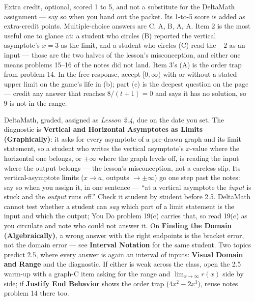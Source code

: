 \documentclass[10pt]{article}
\begin{document}
\begin{teachernote}[AP Practice]
Extra credit, optional, scored 1 to 5, and not a substitute for the DeltaMath assignment --- say so when you
hand out the packet. Its 1-to-5 score is added as extra-credit points. Multiple-choice answers are C, A, B, A, A. Item 2 is the most useful one to
glance at: a student who circles (B) reported the vertical asymptote's $x = 3$ as the limit,
and a student who circles (C) read the $-2$ as an input --- those are the two halves of the
lesson's misconception, and either one means problems 15--16 of the notes did not land. Item 3's
(A) is the order trap from problem 14. In the free response, accept $[0, \infty)$ with or without
a stated upper limit on the game's life in (b); part (e) is the deepest question on the page ---
credit any answer that reaches $8/(t + 1) = 0$ and says it has no solution, so 9 is not in the
range.
\end{teachernote}

\begin{teachernote}[Homework]
DeltaMath, graded, assigned as \textit{Lesson 2.4}, due on the date you set. The diagnostic is
\textbf{Vertical and Horizontal Asymptotes as Limits (Graphically)}: it asks for every
asymptote of a pre-drawn graph and its limit statement, so a student who writes the vertical
asymptote's $x$-value where the horizontal one belongs, or $\pm\infty$ where the graph levels
off, is reading the input where the output belongs --- the lesson's misconception, not a
careless slip. Its vertical-asymptote limits ($x \to a$, outputs $\to \pm\infty$) go one step
past the notes: say so when you assign it, in one sentence --- ``at a vertical asymptote the
\emph{input} is stuck and the \emph{output} runs off.'' Check it student by student before 2.5. DeltaMath cannot test whether a student can
\textit{say} which part of a limit statement is the input and which the output; You Do problem
19(c) carries that, so read 19(c) as you circulate and note who could not answer it. On
\textbf{Finding the Domain (Algebraically)}, a wrong answer with the right endpoints is the
bracket error, not the domain error --- see \textbf{Interval Notation} for the same student. Two
topics predict 2.5, where every answer is again an interval of inputs: \textbf{Visual Domain
and Range} and the diagnostic. If either is weak across the class, open the 2.5 warm-up with a
graph-C item asking for the range and $\lim_{x \to \infty} r(x)$ side by side; if
\textbf{Justify End Behavior} shows the order trap ($4x^2 - 2x^3$), reuse notes problem 14
there too.
\end{teachernote}
\end{document}
